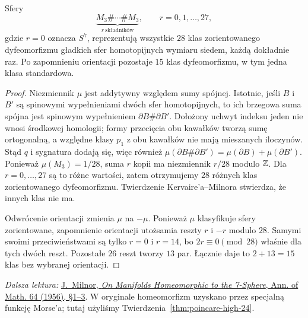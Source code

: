 \begin{twierdzenie}
\label{thm:all-seven-spheres-25}
Sfery
\[
 \underbrace{M_3\#\cdots\#M_3}_{r\ \text{składników}},
 \qquad r=0,1,\ldots,27,
\]
gdzie $r=0$ oznacza $S^7$,
reprezentują wszystkie $28$ klas
zorientowanego dyfeomorfizmu
gładkich sfer homotopijnych
wymiaru siedem, każdą dokładnie raz.
Po zapomnieniu orientacji pozostaje
$15$ klas dyfeomorfizmu, w tym
jedna klasa standardowa.
\end{twierdzenie}
\begin{proof}
Niezmiennik $\mu$ jest addytywny
względem sumy spójnej. Istotnie,
jeśli $B$ i $B'$ są spinowymi
wypełnieniami dwóch sfer
homotopijnych, to ich brzegowa
suma spójna jest spinowym
wypełnieniem $\partial B\#\partial B'$.
Dołożony uchwyt indeksu jeden nie
wnosi środkowej homologii; formy
przecięcia obu kawałków tworzą
sumę ortogonalną, a względne klasy
$p_1$ z obu kawałków nie mają
mieszanych iloczynów. Stąd $q$ i
sygnatura dodają się, więc również
$\mu(\partial B\#\partial B')
=\mu(\partial B)+\mu(\partial B')$.
Ponieważ $\mu(M_3)=1/28$, suma
$r$ kopii ma niezmiennik $r/28$
modulo $\mathbb{Z}$. Dla $r=0,\ldots,27$
są to różne wartości, zatem
otrzymujemy $28$ różnych klas
zorientowanego dyfeomorfizmu.
Twierdzenie Kervaire'a--Milnora
stwierdza, że innych klas nie ma.

Odwrócenie orientacji zmienia
$\mu$ na $-\mu$. Ponieważ $\mu$
klasyfikuje sfery zorientowane,
zapomnienie orientacji utożsamia
reszty $r$ i $-r$ modulo $28$.
Samymi swoimi przeciwieństwami
są tylko $r=0$ i $r=14$, bo
$2r\equiv0\pmod{28}$ właśnie
dla tych dwóch reszt. Pozostałe
$26$ reszt tworzy $13$ par.
Łącznie daje to $2+13=15$
klas bez wybranej orientacji.
\end{proof}

\par\smallskip
{\footnotesize\noindent\emph{Dalsza lektura:}
\href{https://sites.math.rutgers.edu/~feehan/teaching/math866/milnor7sphere.pdf}
{J.\ Milnor, \emph{On Manifolds Homeomorphic
to the 7-Sphere}, Ann. of Math. 64 (1956),
§1--3}. W oryginale homeomorfizm
uzyskano przez specjalną funkcję
Morse'a; tutaj użyliśmy
Twierdzenia~\ref{thm:poincare-high-24}.\par}

\clearpage
